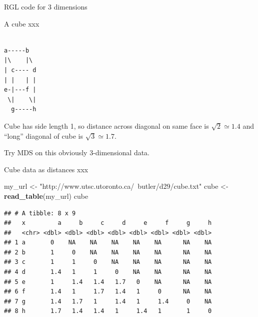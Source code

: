 \documentclass[ignorenonframetext,]{beamer}
\newenvironment{Shaded}{\begin{snugshade}}{\end{snugshade}}
\newcommand{\DataTypeTok}[1]{\textcolor[rgb]{0.13,0.29,0.53}{#1}}
\newcommand{\FloatTok}[1]{\textcolor[rgb]{0.00,0.00,0.81}{#1}}
\newcommand{\KeywordTok}[1]{\textcolor[rgb]{0.13,0.29,0.53}{\textbf{#1}}}
\newcommand{\NormalTok}[1]{#1}
\newcommand{\OperatorTok}[1]{\textcolor[rgb]{0.81,0.36,0.00}{\textbf{#1}}}
\newcommand{\StringTok}[1]{\textcolor[rgb]{0.31,0.60,0.02}{#1}}
\begin{document}
\begin{frame}[fragile]{RGL code for 3 dimensions}
\protect\hypertarget{rgl-code-for-3-dimensions}{}

\begin{Shaded}
\end{Shaded}

\end{frame}

\begin{frame}[fragile]{A cube xxx}
\protect\hypertarget{a-cube-xxx}{}

\begin{verbatim}

a-----b
|\    |\
| c---- d
| |   | |
e-|---f |
 \|    \|
  g-----h
\end{verbatim}

Cube has side length 1, so distance across diagonal on same face is
\(\sqrt{2}\simeq 1.4\) and ``long'' diagonal of cube is
\(\sqrt{3}\simeq 1.7\). \vspace{3ex}

Try MDS on this obviously 3-dimensional data.

\end{frame}

\begin{frame}[fragile]{Cube data as distances xxx}
\protect\hypertarget{cube-data-as-distances-xxx}{}

\footnotesize

\begin{Shaded}
\begin{Highlighting}[]
\NormalTok{my_url <-}\StringTok{ "http://www.utsc.utoronto.ca/~butler/d29/cube.txt"}
\NormalTok{cube <-}\StringTok{ }\KeywordTok{read_table}\NormalTok{(my_url)}
\NormalTok{cube}
\end{Highlighting}
\end{Shaded}

\begin{verbatim}
## # A tibble: 8 x 9
##   x         a     b     c     d     e     f     g     h
##   <chr> <dbl> <dbl> <dbl> <dbl> <dbl> <dbl> <dbl> <dbl>
## 1 a       0    NA    NA    NA    NA    NA      NA    NA
## 2 b       1     0    NA    NA    NA    NA      NA    NA
## 3 c       1     1     0    NA    NA    NA      NA    NA
## 4 d       1.4   1     1     0    NA    NA      NA    NA
## 5 e       1     1.4   1.4   1.7   0    NA      NA    NA
## 6 f       1.4   1     1.7   1.4   1     0      NA    NA
## 7 g       1.4   1.7   1     1.4   1     1.4     0    NA
## 8 h       1.7   1.4   1.4   1     1.4   1       1     0
\end{verbatim}

\normalsize

\end{frame}
\end{document}
